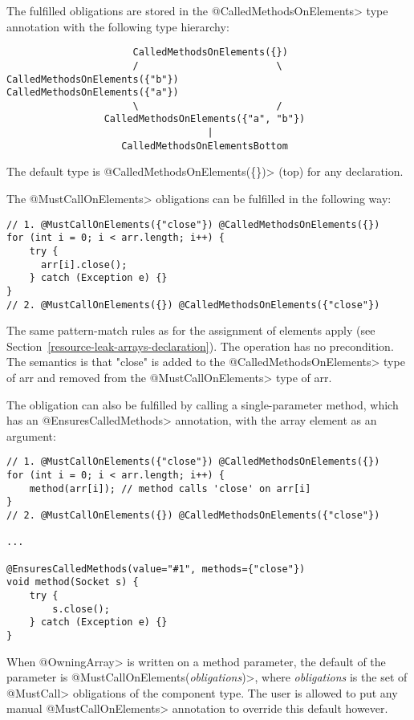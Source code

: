 The fulfilled obligations are stored in the \<@CalledMethodsOnElements> type annotation with the following type hierarchy:
\begin{verbatim}
                      CalledMethodsOnElements({})
                      /                        \
CalledMethodsOnElements({"b"})           CalledMethodsOnElements({"a"})
                      \                        /
                 CalledMethodsOnElements({"a", "b"})
                                   |
                    CalledMethodsOnElementsBottom
\end{verbatim}
The default type is \<@CalledMethodsOnElements(\{\})> (top) for any declaration.


The \<@MustCallOnElements> obligations can be fulfilled in the following way:
\begin{verbatim}
// 1. @MustCallOnElements({"close"}) @CalledMethodsOnElements({})
for (int i = 0; i < arr.length; i++) {
    try {
      arr[i].close();
    } catch (Exception e) {}
}
// 2. @MustCallOnElements({}) @CalledMethodsOnElements({"close"})
\end{verbatim}

The same pattern-match rules as for the assignment of elements apply (see Section~\ref{resource-leak-arrays-declaration}).
The operation has no precondition. The semantics is that "close" is added to the \<@CalledMethodsOnElements> type of arr and removed from the \<@MustCallOnElements> type of arr.

The obligation can also be fulfilled by calling a single-parameter method, which has an \<@EnsuresCalledMethods> annotation, with the array element as an argument:
\begin{verbatim}
// 1. @MustCallOnElements({"close"}) @CalledMethodsOnElements({})
for (int i = 0; i < arr.length; i++) {
    method(arr[i]); // method calls 'close' on arr[i]
}
// 2. @MustCallOnElements({}) @CalledMethodsOnElements({"close"})

...

@EnsuresCalledMethods(value="#1", methods={"close"})
void method(Socket s) {
    try {
        s.close();
    } catch (Exception e) {}
}
\end{verbatim}

When \<@OwningArray> is written on a method parameter, the default of the parameter is \<@MustCallOnElements(\textit{obligations})>, where \textit{obligations} is the set of \<@MustCall> obligations of the component type. The user is allowed to put any manual \<@MustCallOnElements> annotation to override this default however.


